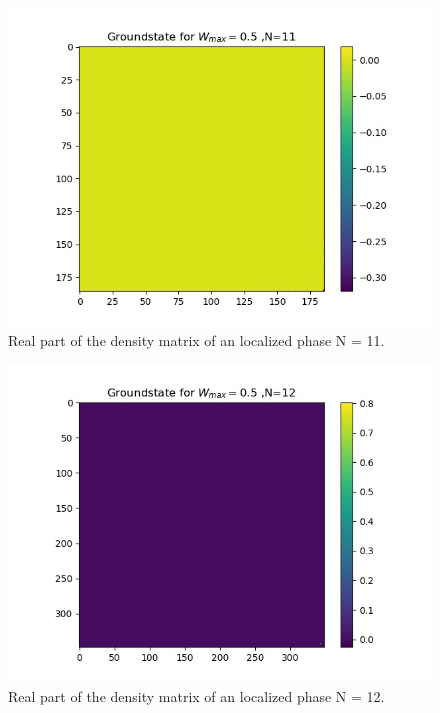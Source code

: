 \documentclass[reprint,amsmath,amssymb,aps,prb]{revtex4-2}
\begin{document}
\begin{figure}[h!]
	\includegraphics[width=\linewidth]{../results/N11_trainingset_groundstate_Wmax8.0.jpg}
	\caption{Real part of the density matrix of an localized phase N = 11.}
\end{figure}
\begin{figure}[h!]
	\includegraphics[width=\linewidth]{../results/N12_trainingset_groundstate_Wmax8.0.jpg}
	\caption{Real part of the density matrix of an localized phase N = 12.}
\end{figure}

\end{document}
